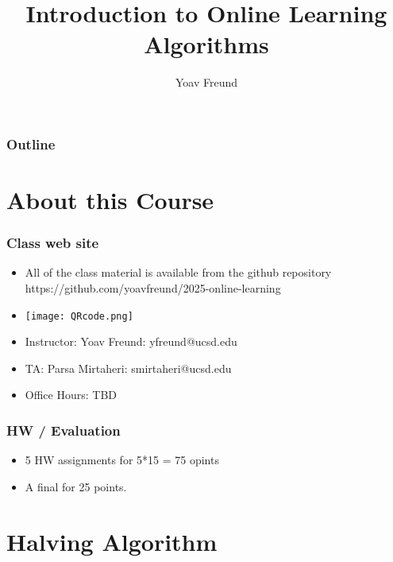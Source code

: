 \documentclass[handout]{beamer}
\title[Introduction] %
{Introduction to Online Learning Algorithms}
\author[Freund] %
{Yoav Freund}
\institute[Universities of Somewhere and Elsewhere] %
\begin{document}
\begin{frame}
  \titlepage
\end{frame}

\begin{frame}
  \frametitle{Outline} 
  \tableofcontents
\end{frame}


\section{About this Course}
\begin{frame}
  \frametitle{Class web site}
  \begin{itemize}
  \item All of the class material is available from the github repository\\
    https://github.com/yoavfreund/2025-online-learning
  \item
    \texttt{[image: QRcode.png]}
  \item Instructor: Yoav Freund: yfreund@ucsd.edu
  \item TA: Parsa Mirtaheri: smirtaheri@ucsd.edu
  \item Office Hours: TBD
  \end{itemize}
\end{frame}

  \begin{frame}
    \frametitle{HW /  Evaluation}
    \begin{itemize}
    \item 5 HW assignments for 5*15 = 75 opints
      \item A final for 25 points.
      \end{itemize}
  \end{frame}

\section{Halving Algorithm}
\end{document}
